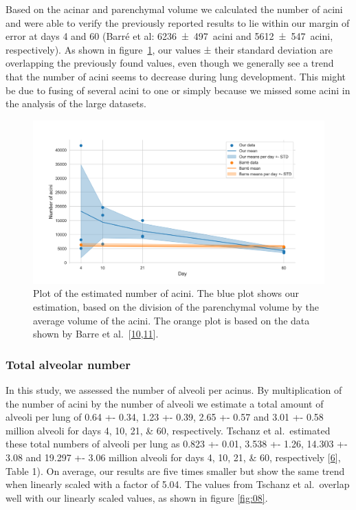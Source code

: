 \documentclass[
  american,
]{article}
\begin{document}
Based on the acinar and parenchymal volume we calculated the number of acini and were able to verify the previously reported results to lie within our margin of error at days 4 and 60 (Barré et al: 6236~±~497~acini and 5612~±~547~acini, respectively).
As shown in figure~\ref{fig:07}, our values ± their standard deviation are overlapping the previously found values, even though we generally see a trend that the number of acini seems to decrease during lung development.
This might be due to fusing of several acini to one or simply because we missed some acini in the analysis of the large datasets.

\begin{figure}
\hypertarget{fig:07}{%
\centering
\includegraphics{images/fig07.png}
\caption{Plot of the estimated number of acini.
The blue plot shows our estimation, based on the division of the parenchymal volume by the average volume of the acini.
The orange plot is based on the data shown by Barre et al.~{[}\protect\hyperlink{ref-14OP85b2F}{10},\protect\hyperlink{ref-uFNlWogb}{11}{]}.}\label{fig:07}
}
\end{figure}

\hypertarget{total-alveolar-number}{%
\subsubsection{Total alveolar number}\label{total-alveolar-number}}

In this study, we assessed the number of alveoli per acinus.
By multiplication of the number of acini by the number of alveoli we estimate a total amount of alveoli per lung of 0.64 +- 0.34, 1.23 +- 0.39, 2.65 +- 0.57 and 3.01 +- 0.58 million alveoli for days 4, 10, 21, \& 60, respectively.
Tschanz et al.~estimated these total numbers of alveoli per lung as 0.823 +- 0.01, 3.538 +- 1.26, 14.303 +- 3.08 and 19.297 +- 3.06 million alveoli for days 4, 10, 21, \& 60, respectively {[}\protect\hyperlink{ref-wnl86DEM}{6}{]}, Table 1).
On average, our results are five times smaller but show the same trend when linearly scaled with a factor of 5.04.
The values from Tschanz et al.~overlap well with our linearly scaled values, as shown in figure \ref{fig:08}.
\end{document}
